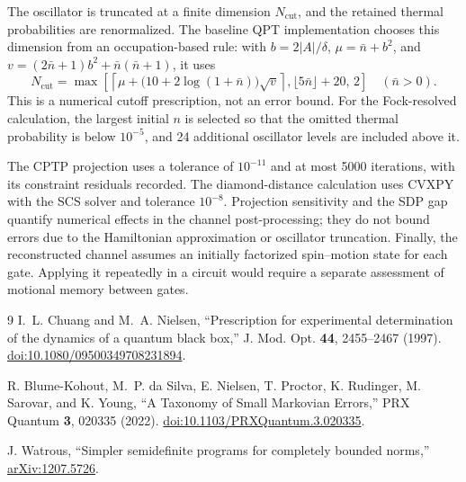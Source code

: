 \documentclass[a4paper,11pt]{article}
\begin{document}
The oscillator is truncated at a finite dimension $N_{\mathrm{cut}}$,
and the retained thermal probabilities are renormalized. The baseline
QPT implementation chooses this dimension from an occupation-based rule:
with $b=2|A|/\delta$, $\mu=\bar n+b^2$, and
$v=(2\bar n+1)b^2+\bar n(\bar n+1)$, it uses
\begin{equation}
 N_{\mathrm{cut}}=\max\!\left[
 \left\lceil\mu+\bigl(10+2\log(1+\bar n)\bigr)\sqrt v\right\rceil,
 \lfloor5\bar n\rfloor+20,\,2\right]
 \quad(\bar n>0).
\end{equation}
This is a numerical cutoff prescription, not an error bound.
For the Fock-resolved calculation, the largest initial $n$ is selected
so that the omitted thermal probability is below $10^{-5}$, and 24
additional oscillator levels are included above it.

The CPTP projection uses a tolerance of $10^{-11}$ and at most 5000
iterations, with its constraint residuals recorded. The diamond-distance
calculation uses CVXPY with the SCS solver and tolerance $10^{-8}$.
Projection sensitivity and the SDP gap quantify numerical effects in
the channel post-processing; they do not bound errors due to the
Hamiltonian approximation or oscillator truncation. Finally, the
reconstructed channel assumes an initially factorized spin--motion state
for each gate. Applying it repeatedly in a circuit would require a
separate assessment of motional memory between gates.

\begin{thebibliography}{9}
I.~L. Chuang and M.~A. Nielsen,
``Prescription for experimental determination of the dynamics of a quantum
black box,'' J. Mod. Opt. \textbf{44}, 2455--2467 (1997).
\href{https://doi.org/10.1080/09500349708231894}{doi:10.1080/09500349708231894}.

R. Blume-Kohout, M.~P. da Silva, E. Nielsen, T. Proctor,
K. Rudinger, M. Sarovar, and K. Young,
``A Taxonomy of Small Markovian Errors,''
PRX Quantum \textbf{3}, 020335 (2022).
\href{https://doi.org/10.1103/PRXQuantum.3.020335}{doi:10.1103/PRXQuantum.3.020335}.

J. Watrous, ``Simpler semidefinite programs for completely bounded norms,''
\href{https://arxiv.org/abs/1207.5726}{arXiv:1207.5726}.
\end{thebibliography}
\end{document}
